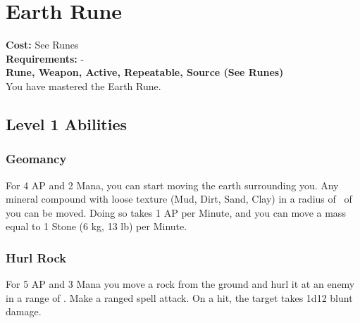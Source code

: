 \twocolumn
\section{Earth Rune}\label{rune:earth}
\textbf{Cost:} See Runes\\
\textbf{Requirements:} -\\
\textbf{Rune, Weapon, Active, Repeatable, Source (See Runes)}\\
You have mastered the Earth Rune.

\subsection{Level 1 Abilities}

\subsubsection{Geomancy}
For 4 AP and 2 Mana, you can start moving the earth surrounding you.
Any mineral compound with loose texture (Mud, Dirt, Sand, Clay) in a radius of~ of you can be moved.
Doing so takes 1 AP per Minute, and you can move a mass equal to 1 Stone (6 kg, 13 lb) per Minute.

\subsubsection{Hurl Rock}
For 5 AP and 3 Mana you move a rock from the ground and hurl it at an enemy in a range of .
Make a ranged spell attack.
On a hit, the target takes 1d12 blunt damage.